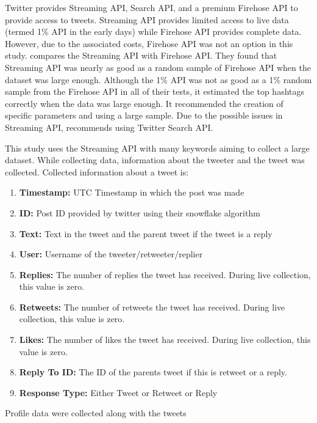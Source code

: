 \documentclass[letterpaper]{article}
\begin{document}
Twitter provides Streaming API, Search API, and a premium Firehose API to provide access to tweets. Streaming API provides limited access to live data (termed 1\% API in the early days) while Firehose API
provides complete data. However, due to the associated costs, Firehose API was not an option in this study. \cite{morstatter2013sample} compares the Streaming API with Firehose API.
They found that Streaming API was nearly as good as a random sample of Firehose API when the dataset was large enough. Although the 1\% API was not as good as a 1\% random sample from the Firehose API in 
all of their tests, it estimated the top hashtags correctly when the data was large enough. It recommended the creation of specific parameters and using a large sample. 
Due to the possible issues in Streaming API, \cite{bessi2016social} recommends using Twitter Search API. 

\par This study uses the Streaming API with many keywords aiming to collect a large dataset. While collecting data, information about the tweeter and the tweet was collected. 
Collected information about a tweet is:
\begin{enumerate}[label=\textbf{\arabic*}]
    \item \textbf{Timestamp:} UTC Timestamp in which the post was made
    \item \textbf{ID:} Post ID provided by twitter using their snowflake algorithm
    \item \textbf{Text:} Text in the tweet and the parent tweet if the tweet is a reply
    \item \textbf{User:} Username of the tweeter/retweeter/replier
    \item \textbf{Replies:} The number of replies the tweet has received. During live collection, this value is zero.
    \item \textbf{Retweets:} The number of retweets the tweet has received. During live collection, this value is zero.
    \item \textbf{Likes:} The number of likes the tweet has received. During live collection, this value is zero.
    \item \textbf{Reply To ID:} The ID of the parents tweet if this is retweet or a reply.
    \item \textbf{Response Type:} Either Tweet or Retweet or Reply
\end{enumerate}
\bigskip
Profile data were collected along with the tweets
\end{document}
